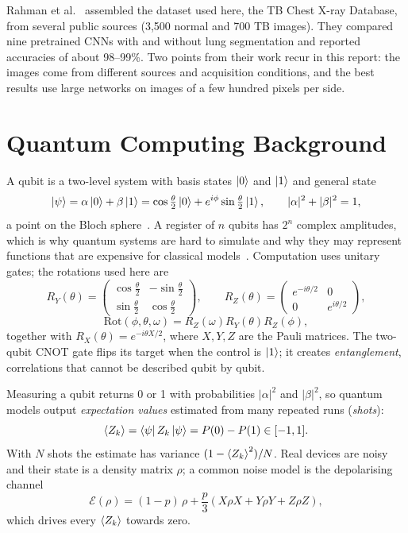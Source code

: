 Rahman et al.~\cite{rahman2020} assembled the dataset used here, the TB
Chest X-ray Database, from several public sources (3,500 normal and 700 TB
images). They compared nine pretrained CNNs with and without lung
segmentation and reported accuracies of about 98--99\%. Two points from
their work recur in this report: the images come from different sources
and acquisition conditions, and the best results use large networks on
images of a few hundred pixels per side.

\section{Quantum Computing Background}
\label{sec:rw_qc}
A qubit is a two-level system with basis states $\left|0\right\rangle$ and $\left|1\right\rangle$ and
general state
\begin{equation}
\left|\psi\right\rangle = \alpha\left|0\right\rangle + \beta\left|1\right\rangle
= \cos\tfrac{\theta}{2}\left|0\right\rangle + e^{i\phi}\sin\tfrac{\theta}{2}\left|1\right\rangle,
\qquad |\alpha|^2 + |\beta|^2 = 1,
\end{equation}
a point on the Bloch sphere~\cite{nielsen2010}. A register of $n$ qubits has
$2^n$ complex amplitudes, which is why quantum systems are hard to simulate
and why they may represent functions that are expensive for classical
models~\cite{biamonte2017}. Computation uses unitary gates; the rotations
used here are
\begin{equation}
R_Y(\theta) = \begin{pmatrix}\cos\frac{\theta}{2} & -\sin\frac{\theta}{2}\\[2pt]
\sin\frac{\theta}{2} & \cos\frac{\theta}{2}\end{pmatrix},\qquad
R_Z(\theta) = \begin{pmatrix}e^{-i\theta/2} & 0\\ 0 & e^{i\theta/2}\end{pmatrix},
\end{equation}
\begin{equation}
\mathrm{Rot}(\phi,\theta,\omega) = R_Z(\omega)R_Y(\theta)R_Z(\phi),
\end{equation}
together with $R_X(\theta) = e^{-i\theta X/2}$, where $X, Y, Z$ are the Pauli
matrices. The two-qubit CNOT gate flips its target when the control is
$\left|1\right\rangle$; it creates \emph{entanglement}, correlations that cannot be
described qubit by qubit.

Measuring a qubit returns 0 or 1 with probabilities $|\alpha|^2$ and
$|\beta|^2$, so quantum models output \emph{expectation values} estimated
from many repeated runs (\emph{shots}):
\begin{equation}
\left\langle Z_k\right\rangle = \left\langle\psi\right| Z_k \left|\psi\right\rangle = P(0) - P(1) \in [-1, 1].
\label{eq:expz}
\end{equation}
With $N$ shots the estimate has variance $(1-\left\langle Z_k\right\rangle^2)/N$. Real devices
are noisy and their state is a density matrix $\rho$; a common noise model
is the depolarising channel
\begin{equation}
\mathcal{E}(\rho) = (1-p)\,\rho + \frac{p}{3}\left(X\rho X + Y\rho Y + Z\rho Z\right),
\label{eq:depol}
\end{equation}
which drives every $\left\langle Z_k\right\rangle$ towards zero.

